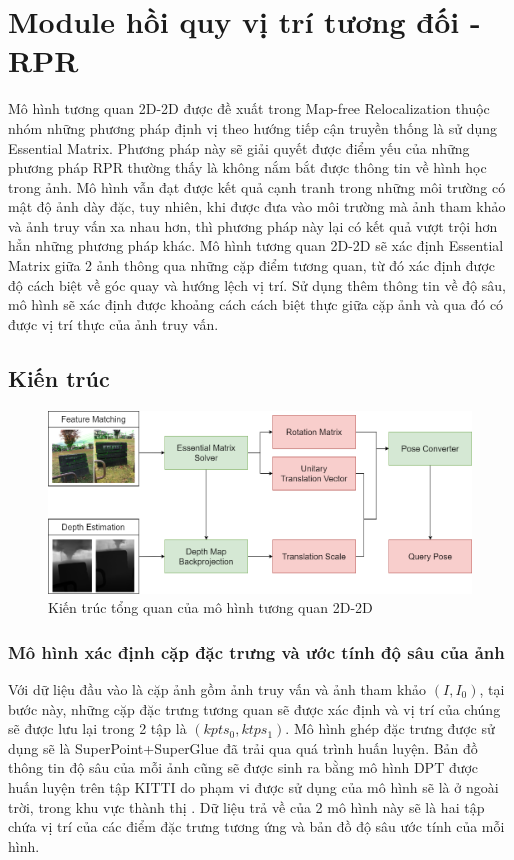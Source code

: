 \section{Module hồi quy vị trí tương đối - RPR}
Mô hình tương quan 2D-2D được đề xuất trong Map-free Relocalization \cite{arnold2022mapfree} thuộc nhóm những phương pháp định vị theo hướng tiếp cận truyền thống là sử dụng Essential Matrix. Phương pháp này sẽ giải quyết được điểm yếu của những phương pháp RPR thường thấy là không nắm bắt được thông tin về hình học trong ảnh. Mô hình vẫn đạt được kết quả cạnh tranh trong những môi trường có mật độ ảnh dày đặc, tuy nhiên, khi được đưa vào môi trường mà ảnh tham khảo và ảnh truy vấn xa nhau hơn, thì phương pháp này lại có kết quả vượt trội hơn hẳn những phương pháp khác. Mô hình tương quan 2D-2D sẽ xác định Essential Matrix giữa 2 ảnh thông qua những cặp điểm tương quan, từ đó xác định được độ cách biệt về góc quay và hướng lệch vị trí. Sử dụng thêm thông tin về độ sâu, mô hình sẽ xác định được khoảng cách cách biệt thực giữa cặp ảnh và qua đó có được vị trí thực của ảnh truy vấn.

\subsection{Kiến trúc}

\begin{figure}[htbp]
  \centering
  \includegraphics[width=\textwidth]{pics/Proposal/2d_2d.png}
  \caption{Kiến trúc tổng quan của mô hình tương quan 2D-2D}
\end{figure}

\subsubsection{Mô hình xác định cặp đặc trưng và ước tính độ sâu của ảnh}

Với dữ liệu đầu vào là cặp ảnh gồm ảnh truy vấn và ảnh tham khảo $(I, I_0)$, tại bước này, những cặp đặc trưng tương quan sẽ được xác định và vị trí của chúng sẽ được lưu lại trong 2 tập là $(kpts_0, ktps_1)$. Mô hình ghép đặc trưng được sử dụng sẽ là SuperPoint+SuperGlue \cite{sarlin2020superglue} đã trải qua quá trình huấn luyện. Bản đồ thông tin độ sâu của mỗi ảnh cũng sẽ được sinh ra bằng mô hình DPT \cite{ranftl2021vision} được huấn luyện trên tập KITTI do phạm vi được sử dụng của mô hình sẽ là ở ngoài trời, trong khu vực thành thị \cite{arnold2022mapfree}. Dữ liệu trả về của 2 mô hình này sẽ là hai tập chứa vị trí của các điểm đặc trưng tương ứng và bản đồ độ sâu ước tính của mỗi hình.


